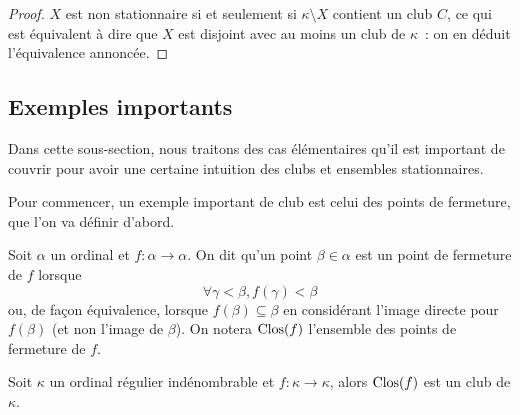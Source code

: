 \begin{proof}
  $X$ est non stationnaire si et seulement si $\kappa\setminus X$ contient
  un club $C$, ce qui est équivalent à dire que $X$ est disjoint avec au moins
  un club de $\kappa$~: on en déduit l'équivalence annoncée.
\end{proof}

\subsection{Exemples importants}

Dans cette sous-section, nous traitons des cas élémentaires qu'il est important
de couvrir pour avoir une certaine intuition des clubs et ensembles
stationnaires.

Pour commencer, un exemple important de club est celui des points de fermeture,
que l'on va définir d'abord.

\begin{definition}
  Soit $\alpha$ un ordinal et $f : \alpha \to \alpha$. On dit qu'un point
  $\beta \in \alpha$ est un point de fermeture de $f$ lorsque
  \[\forall \gamma < \beta, f(\gamma) < \beta\]
  ou, de façon équivalence, lorsque $f(\beta) \subseteq \beta$ en considérant
  l'image directe pour $f(\beta)$ (et non l'image de $\beta$). On notera
  $\operatorname{Clos}(f)$ l'ensemble des points de fermeture de $f$.
\end{definition}

\begin{proposition}
  Soit $\kappa$ un ordinal régulier indénombrable et $f : \kappa \to \kappa$,
  alors $\operatorname{Clos}(f)$ est un club de $\kappa$.
\end{proposition}

